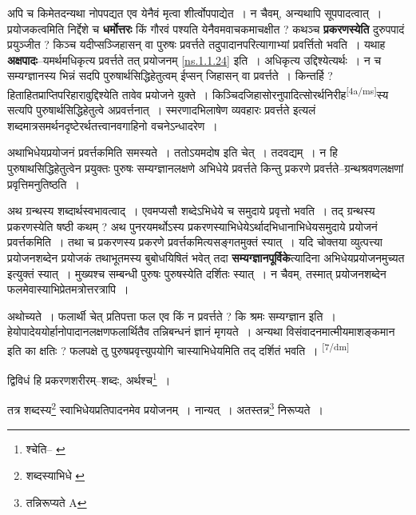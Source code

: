 \documentclass[article,12pt,a4paper]{memoir}
\begin{document}
	  \pstart अपि च किमेतदन्यथा नोपपद्यत एव येनैवं मृत्वा शीर्त्वोपपाद्येत । न चैवम्, अन्यथापि सूपपादत्वात् । प्रयोजकत्वमिति निर्द्देशे च \textbf{धर्मोत्तरः} किं गौरवं पश्यति येनैवमवाचकमाचक्षीत ? कथञ्च \textbf{प्रकरणस्येति} दुरुपपादं प्रयुञ्जीत ? किञ्च यदीप्सञ्जिहासन् वा पुरुषः प्रवर्त्तते तदुपादानपरित्यागाभ्यां प्रवर्त्तितो भवति । यथाह \textbf{अक्षपादः}--यमर्थमधिकृत्य प्रवर्त्तते तत् प्रयोजनम् \cref{ns.1.1.24} इति । अधिकृत्य उद्दिश्येत्यर्थः । न च सम्यग्ज्ञानस्य भिन्नं सदपि पुरुषार्थसिद्धिहेतुत्वम् ईप्सन् जिहासन् वा प्रवर्त्तते । किन्तर्हि ? हिताहितप्राप्तिपरिहारावुद्दिश्येति तावेव प्रयोजने युक्ते । किञ्चिदजिहासोरनुपादित्सोरर्थनिरीह\leavevmode\textsuperscript{\rmlatinfont\tiny [4a/ms]}स्य सत्यपि पुरुषार्थसिद्धिहेतुत्वे अप्रवर्त्तनात् । स्मरणादभिलाषेण व्यवहारः प्रवर्त्तते इत्यलं शब्दमात्रसमर्थनदृष्टेरर्थतत्त्वानवगाहिनो वचनेऽन्धादरेण ।
	\pend
      

	  \pstart अथाभिधेयप्रयोजनं प्रवर्त्तकमिति समस्यते । ततोऽयमदोष इति चेत् । तदवद्यम् । न हि पुरुषाथसिद्धिहेतुत्वेन प्रयुक्तः पुरुषः सम्यग्ज्ञानलक्षणे अभिधेये प्रवर्त्तते किन्तु प्रकरणे प्रवर्त्तते--ग्रन्थश्रवणलक्षणां प्रवृत्तिमनुतिष्ठति ।
	\pend
      

	  \pstart अथ ग्रन्थस्य शब्दार्थस्वभावत्वाद् । एवमप्यसौ शब्देऽभिधेये च समुदाये प्रवृत्तो भवति । तद् ग्रन्थस्य प्रकरणस्येति षष्ठी कथम् ? अथ पुनरयमर्थोऽस्य प्रकरणस्याभिधेयेऽर्थादभिधानाभिधेयसमुदाये प्रयोजनं प्रवर्त्तकमिति । तथा च प्रकरणस्य प्रकरणे प्रवर्त्तकमित्यसङ्गतमुक्तं स्यात् । यदि चोक्तया व्युत्पत्त्या प्रयोजनशब्देन प्रयोजकं तथाभूतमस्य बुबोधयिषितं भवेत् तदा \textbf{सम्यग्ज्ञानपूर्विके}त्यादिना अभिधेयप्रयोजनमुच्यत इत्युक्तं स्यात् । मुख्यश्च सम्बन्धी पुरुषः पुरुषस्येति दर्शितः स्यात् । न चैवम्, तस्मात् प्रयोजनशब्देन फलमेवास्याभिप्रेतमत्रोत्तरत्रापि ।
	\pend
      

	  \pstart अथोच्यते । फलार्थी चेत् प्रतिपत्ता फल एव किं न प्रवर्त्तते ? कि श्रमः सम्यग्ज्ञान इति । हेयोपादेययोर्हानोपादानलक्षणफलार्थितैव तन्निबन्धनं ज्ञानं मृगयते । अन्यथा विसंवादनमात्मीयमाशङ्कमान इति का क्षतिः ? फलपक्षे तु पुरुषप्रवृत्त्युपयोगि चास्याभिधेयमिति तद् दर्शितं भवति ।
	\pend
      \leavevmode\textsuperscript{\rmlatinfont\tiny [7/dm]}

	  \pstart द्विविधं हि प्रकरणशरीरम्--शब्दः, अर्थश्च\footnote{श्चेति--\cite{dp-edE} \cite{dp-edH} \cite{dp-edN} \cite{dp-edP}} ।
	\pend
       

	  \pstart तत्र शब्दस्य\footnote{शब्दस्याभिधे \cite{dp-msB} \cite{dp-msC} \cite{dp-msD}} स्वाभिधेयप्रतिपादनमेव प्रयोजनम् । नान्यत् । अतस्तन्न\footnote{तन्निरूप्यते A} निरूप्यते ।
	\pend
       
\end{document}
